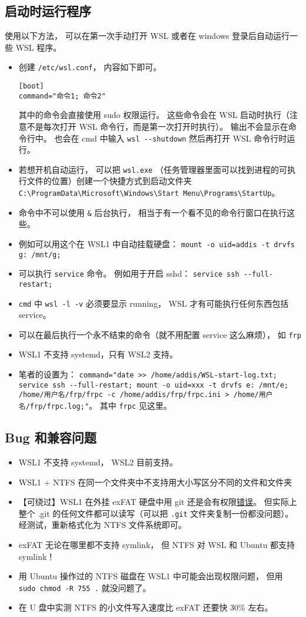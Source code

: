 \subsection{启动时运行程序}
使用以下方法， 可以在第一次手动打开 WSL 或者在 windows 登录后自动运行一些 WSL 程序。

\begin{itemize}
\item 创建 \verb|/etc/wsl.conf|， 内容如下即可。
\begin{lstlisting}[language=none]
[boot]
command="命令1; 命令2"
\end{lstlisting}
其中的命令会直接使用 sudo 权限运行。 这些命令会在 WSL 启动时执行（注意不是每次打开 WSL 命令行，而是第一次打开时执行）。 输出不会显示在命令行中。 也会在 cmd 中输入 \verb|wsl --shutdown| 然后再打开 WSL 命令行时运行。
\item 若想开机自动运行， 可以把 \verb|wsl.exe| （任务管理器里面可以找到进程的可执行文件的位置）创建一个快捷方式到启动文件夹 \verb|C:\ProgramData\Microsoft\Windows\Start Menu\Programs\StartUp|。
\item 命令中不可以使用 \verb|&| 后台执行， 相当于有一个看不见的命令行窗口在执行这些。
\item 例如可以用这个在 WSL1 中自动挂载硬盘： \verb|mount -o uid=addis -t drvfs g: /mnt/g;|
\item 可以执行 \verb|service| 命令。 例如用于开启 sshd： \verb|service ssh --full-restart;|
\item \verb|cmd| 中 \verb|wsl -l -v| 必须要显示 running， WSL 才有可能执行任何东西包括 service。
\item 可以在最后执行一个永不结束的命令（就不用配置 service 这么麻烦）， 如 \verb|frp|
\item WSL1 不支持 systemd，只有 WSL2 支持。
\item 笔者的设置为： \verb|command="date >> /home/addis/WSL-start-log.txt; service ssh --full-restart; mount -o uid=xxx -t drvfs e: /mnt/e; /home/用户名/frp/frpc -c /home/addis/frp/frpc.ini > /home/用户名/frp/frpc.log;"|。 其中 \verb|frpc| 见这里。
\end{itemize}

\subsection{Bug 和兼容问题}
\begin{itemize}
\item WSL1 不支持 systemd， WSL2 目前支持。
\item WSL1 + NTFS 在同一个文件夹中不支持用大小写区分不同的文件和文件夹
\item 【可绕过】WSL1 在外挂 exFAT 硬盘中用 git 还是会有权限\href{https://github.com/microsoft/WSL/issues/5179}{错误}。 但实际上整个 .git 的任何文件都可以读写（可以把 \verb|.git| 文件夹复制一份都没问题）。 经测试，重新格式化为 NTFS 文件系统即可。
\item  exFAT 无论在哪里都不支持 symlink， 但 NTFS 对 WSL 和 Ubuntu 都支持 symlink！
\item 用 Ubuntu 操作过的 NTFS 磁盘在 WSL1 中可能会出现权限问题， 但用 \verb|sudo chmod -R 755 .| 就没问题了。
\item 在 U 盘中实测 NTFS 的小文件写入速度比 exFAT 还要快 30\% 左右。
\end{itemize}
